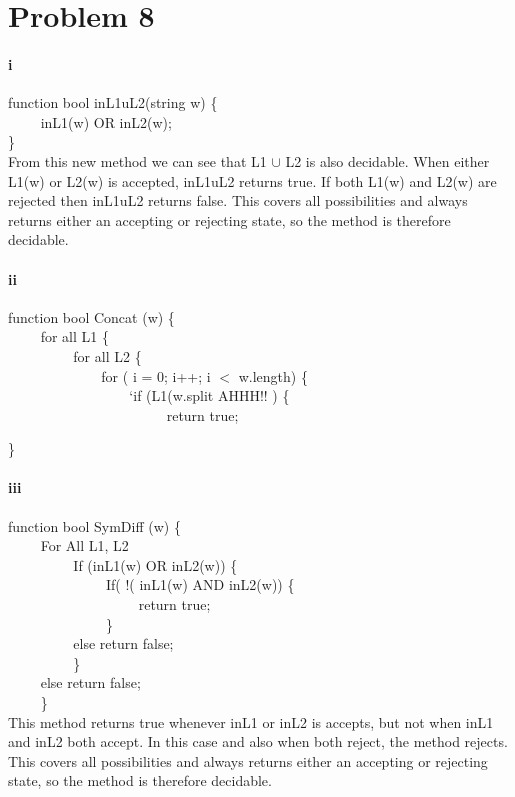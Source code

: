 \documentclass[10pt,letter]{article}
\begin{document}
\section*{Problem 8}
\paragraph{i}
 function bool inL1uL2(string w) \{ \\
$\qquad$  inL1(w) OR inL2(w); \\
\} \\
From this new method we can see that L1 $\cup$ L2 is also decidable. When either L1(w) or L2(w) is accepted, inL1uL2 returns true. If both L1(w) and L2(w) are rejected then inL1uL2 returns false. This covers all possibilities and always returns either an accepting or rejecting state, so the method is therefore decidable. 

\paragraph{ii}
function bool Concat (w)  \{  \\
$\qquad$	for all L1 \{ \\
$\qquad$ $\qquad$ for all L2 \{ \\
$\qquad$$\qquad$ $\qquad$ for ( i = 0; i++; i $<$ w.length) \{ \\	
$\qquad$$\qquad$ $\qquad$ $\qquad$`if (L1(w.split AHHH!! ) \{ \\
$\qquad$$\qquad$ $\qquad$ $\qquad$ $\qquad$ return true;

\}

\paragraph{iii}
function bool SymDiff (w) \{  \\
$\qquad$ 	For All L1, L2 \\
$\qquad$ $\qquad$ If (inL1(w) OR inL2(w)) \{ \\
$\qquad$ $\qquad$ $\qquad$ If( !( inL1(w) AND inL2(w))  \{ \\
$\qquad$ $\qquad$ $\qquad$ $\qquad$ return true; \\
$\qquad$ $\qquad$ $\qquad$			\} \\
$\qquad$ $\qquad$ 		else return false; \\
$\qquad$	$\qquad$	\} \\
$\qquad$	else	return false; \\
$\qquad$ \} \\
This method returns true whenever inL1 or inL2 is accepts, but not when inL1 and inL2 both accept. In this case and also when both reject, the method rejects. This covers all possibilities and always returns either an accepting or rejecting state, so the method is therefore decidable. 
			
\end{document}
